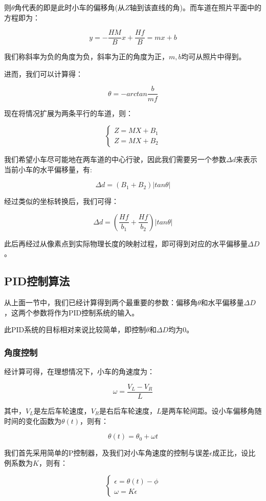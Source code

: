 \documentclass[11pt]{article}
\begin{document}
则$\theta$角代表的即是此时小车的偏移角(从$Z$轴到该直线的角)。而车道在照片平面中的方程即为：

$$
y = -\frac{HM}{B}x + \frac{Hf}{B} = mx + b
$$

我们称斜率为负的角度为负，斜率为正的角度为正，$m, b$均可从照片中得到。

进而，我们可以计算得：

$$
\theta = -arctan\frac{b}{mf}
$$

现在将情况扩展为两条平行的车道，则：

$$
\begin{cases}
Z = MX + B_1 \\
Z = MX + B_2
\end{cases}
$$

我们希望小车尽可能地在两车道的中心行驶，因此我们需要另一个参数$\Delta d$来表示当前小车的水平偏移量，有:

$$
\Delta d = (B_1 + B_2) \vert tan\theta \vert
$$

经过类似的坐标转换后，我们可得：

$$
\Delta d = (\frac{Hf}{b_1} + \frac{Hf}{b_2})\vert tan\theta \vert
$$

此后再经过从像素点到实际物理长度的映射过程，即可得到对应的水平偏移量$\Delta D$。

\subsection{PID控制算法}

从上面一节中，我们已经计算得到两个最重要的参数：偏移角$\theta$和水平偏移量$\Delta D$，这两个参数将作为PID控制系统的输入。

此PID系统的目标相对来说比较简单，即控制$\theta$和$\Delta D$均为0。

\subsubsection{角度控制}

经计算可得，在理想情况下，小车的角速度为：

$$
\omega = \frac{V_L - V_R}{L}
$$

其中，$V_L$是左后车轮速度，$V_R$是右后车轮速度，$L$是两车轮间距。设小车偏移角随时间的变化函数为$\theta(t)$，则有：

$$
\theta(t) = \theta_0 + \omega t
$$

我们首先采用简单的P控制器，及我们对小车角速度的控制与误差$\epsilon$成正比，设比例系数为$K$，则有：

$$
\begin{cases}
\epsilon = \theta(t) - \phi \\
\omega = K\epsilon
\end{cases}
$$
\end{document}
